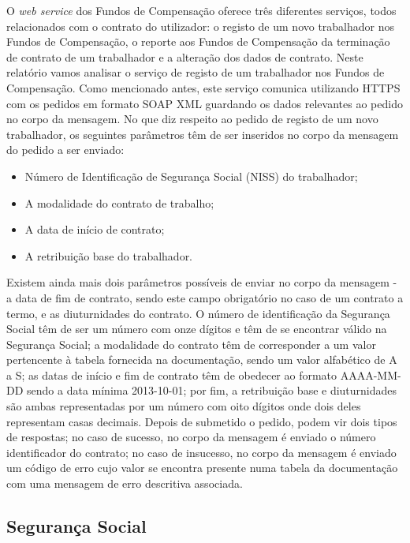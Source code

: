 \documentclass[sigplan]{acmart}
\begin{document}
O \textit{web service} dos Fundos de Compensação oferece três diferentes serviços, todos relacionados com o contrato do utilizador: o registo de um novo trabalhador nos Fundos de Compensação, o reporte aos Fundos de Compensação da terminação de contrato de um trabalhador e a alteração dos dados de contrato. Neste relatório vamos analisar o serviço de registo de um trabalhador nos Fundos de Compensação. Como mencionado antes, este serviço comunica utilizando HTTPS com os pedidos em formato SOAP XML guardando os dados relevantes ao pedido no corpo da mensagem. No que diz respeito ao pedido de registo de um novo trabalhador, os seguintes parâmetros têm de ser inseridos no corpo da mensagem do pedido a ser enviado:
\begin{itemize}
  \item Número de Identificação de Segurança Social (NISS) do trabalhador;
  \item A modalidade do contrato de trabalho;
  \item A data de início de contrato;
  \item A retribuição base do trabalhador.
\end{itemize}
Existem ainda mais dois parâmetros possíveis de enviar no corpo da mensagem - a data de fim de contrato, sendo este campo obrigatório no caso de um contrato a termo, e as diuturnidades do contrato. O número de identificação da Segurança Social têm de ser um número com onze dígitos e têm de se encontrar válido na Segurança Social; a modalidade do contrato têm de corresponder a um valor pertencente à tabela fornecida na documentação, sendo um valor alfabético de A a S; as datas de início e fim de contrato têm de obedecer ao formato AAAA-MM-DD sendo a data mínima 2013-10-01; por fim, a retribuição base e diuturnidades são ambas representadas por um número com oito dígitos onde dois deles representam casas decimais. Depois de submetido o pedido, podem vir dois tipos de respostas; no caso de sucesso, no corpo da mensagem é enviado o número identificador do contrato; no caso de insucesso, no corpo da mensagem é enviado um código de erro cujo valor se encontra presente numa tabela da documentação com uma mensagem de erro descritiva associada.

\subsection{Segurança Social}
\end{document}
